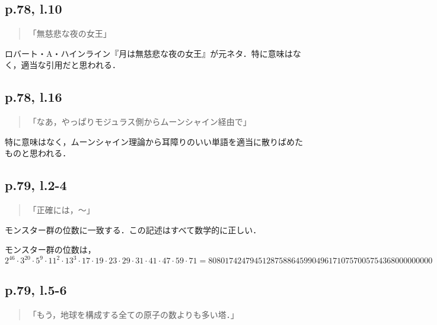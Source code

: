 \documentclass[10pt, a5paper, twoside]{jsarticle}
\theoremstyle{definition}
\begin{document}
		\subsection{p.78, l.10}

			\begin{quote}

				「無慈悲な夜の女王」
				
			\end{quote}

			ロバート・A・ハインライン『月は無慈悲な夜の女王』が元ネタ．特に意味はなく，適当な引用だと思われる．

		\subsection{p.78, l.16}

			\begin{quote}

				「なあ，やっぱりモジュラス側からムーンシャイン経由で」
				
			\end{quote}

			特に意味はなく，ムーンシャイン理論から耳障りのいい単語を適当に散りばめたものと思われる．

		\subsection{p.79, l.2-4}

			\begin{quote}

				「正確には，〜」
				
			\end{quote}

			モンスター群の位数に一致する．この記述はすべて数学的に正しい．

			モンスター群の位数は，$2^{46} \cdot 3^{20} \cdot 5^9 \cdot {11}^2 \cdot {13}^3 \cdot 17 \cdot 19 \cdot 23 \cdot 29 \cdot 31 \cdot 41 \cdot 47 \cdot 59 \cdot 71 = 808017424794512875886459904961710757005754368000000000$

		\subsection{p.79, l.5-6}

			\begin{quote}

				「もう，地球を構成する全ての原子の数よりも多い塔．」
				
			\end{quote}
\end{document}
